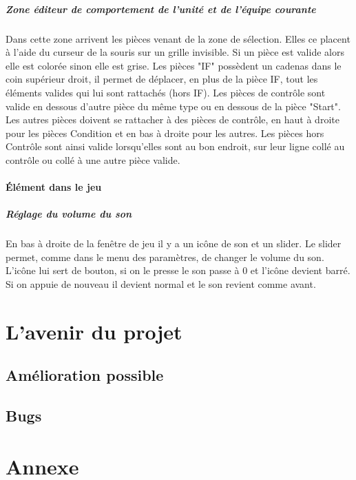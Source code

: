 \documentclass{report}
\begin{document}
\subsubsection{Zone éditeur de comportement de l'unité et de l'équipe courante}
Dans cette zone arrivent les pièces venant de la zone de sélection. Elles ce placent à l'aide du curseur de la souris sur un grille invisible. Si un pièce est valide alors elle est colorée sinon elle est grise. Les pièces "IF" possèdent un cadenas dans le coin supérieur droit, il permet de déplacer, en plus de la pièce IF, tout les éléments valides qui lui sont rattachés (hors IF). Les pièces de contrôle sont valide en dessous d'autre pièce du même type ou en dessous de la pièce "Start". Les autres pièces doivent se rattacher à des pièces de contrôle, en haut à droite pour les pièces Condition et en bas à droite pour les autres. Les pièces hors Contrôle sont ainsi valide lorsqu'elles sont au bon endroit, sur leur ligne collé au contrôle ou collé à une autre pièce valide. 

\subsection{Élément dans le jeu}
\subsubsection{Réglage du volume du son}
En bas à droite de la fenêtre de jeu il y a un icône de son et un slider. Le slider permet, comme dans le menu des paramètres, de changer le volume du son. L’icône lui sert de bouton, si on le presse le son passe à 0 et l’icône devient barré. Si on appuie de nouveau il devient normal et le son revient comme avant.


\newpage
\part{L'avenir du projet}
\chapter{Amélioration possible}
\chapter{Bugs}


\newpage
\part{Annexe}
\end{document}
